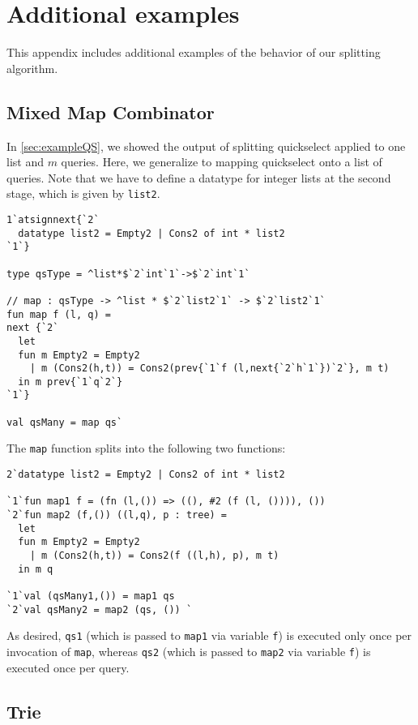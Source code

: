 
\section{Additional examples}

This appendix includes additional examples of the behavior of our
splitting algorithm.

\subsection {Mixed Map Combinator}

In \ref{sec:exampleQS}, we showed the output of splitting quickselect
applied to one list and $m$ queries.  Here, we generalize to mapping
quickselect onto a list of queries. Note that we have to define a
datatype for integer lists at the second stage, which is given by
\texttt{list2}.
\begin{lstlisting} 
1`atsignnext{`2`
  datatype list2 = Empty2 | Cons2 of int * list2
`1`}

type qsType = ^list*$`2`int`1`->$`2`int`1`

// map : qsType -> ^list * $`2`list2`1` -> $`2`list2`1`
fun map f (l, q) = 
next {`2`
  let 
  fun m Empty2 = Empty2
    | m (Cons2(h,t)) = Cons2(prev{`1`f (l,next{`2`h`1`})`2`}, m t)
  in m prev{`1`q`2`}
`1`}

val qsMany = map qs`
\end{lstlisting}
The \texttt{map} function splits into the following two functions:
\begin{lstlisting} 
2`datatype list2 = Empty2 | Cons2 of int * list2

`1`fun map1 f = (fn (l,()) => ((), #2 (f (l, ()))), ())
`2`fun map2 (f,()) ((l,q), p : tree) =
  let 
  fun m Empty2 = Empty2
    | m (Cons2(h,t)) = Cons2(f ((l,h), p), m t) 
  in m q

`1`val (qsMany1,()) = map1 qs
`2`val qsMany2 = map2 (qs, ()) `
\end{lstlisting}

As desired, \texttt{qs1} (which is passed to \texttt{map1} via variable \texttt{f}) is executed only once per invocation of \texttt{map},
whereas \texttt{qs2} (which is passed to \texttt{map2} via variable \texttt{f}) is executed once per query.

\subsection{Trie}

